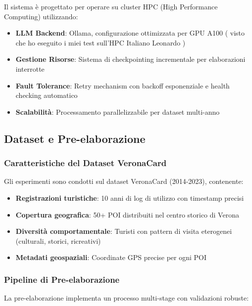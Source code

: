Il sistema è progettato per operare su cluster HPC (High Performance Computing) utilizzando:
\begin{itemize}
\item \textbf{LLM Backend}: Ollama, configurazione ottimizzata per GPU A100 ( visto che ho eseguito i miei test sull'HPC Italiano Leonardo )
\item \textbf{Gestione Risorse}: Sistema di checkpointing incrementale per elaborazioni interrotte
\item \textbf{Fault Tolerance}: Retry mechanism con backoff esponenziale e health checking automatico
\item \textbf{Scalabilità}: Processamento parallelizzabile per dataset multi-anno
\end{itemize}

\subsection{Dataset e Pre-elaborazione}

\subsubsection{Caratteristiche del Dataset VeronaCard}

Gli esperimenti sono condotti sul dataset VeronaCard (2014-2023), contenente:
\begin{itemize}
\item \textbf{Registrazioni turistiche}: 10 anni di log di utilizzo con timestamp precisi
\item \textbf{Copertura geografica}: 50+ POI distribuiti nel centro storico di Verona
\item \textbf{Diversità comportamentale}: Turisti con pattern di visita eterogenei (culturali, storici, ricreativi)
\item \textbf{Metadati geospaziali}: Coordinate GPS precise per ogni POI
\end{itemize}

\subsubsection{Pipeline di Pre-elaborazione}

La pre-elaborazione implementa un processo multi-stage con validazioni robuste:

